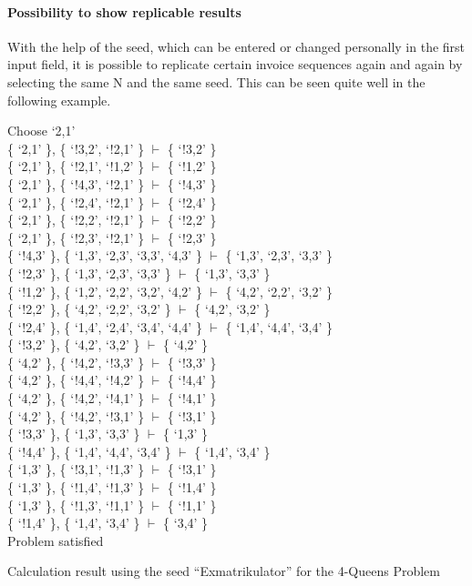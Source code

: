 \paragraph{Possibility to show replicable results}
With the help of the seed, which can be entered or changed personally in the first input field, it is possible to replicate certain invoice sequences again and again by selecting the same N and the same seed. This can be seen quite well in the following example.

\begin{listing}
Choose `2,1'\\
\{ `2,1' \}, \{ `!3,2', `!2,1' \} $\vdash$ \{ `!3,2' \}\\
\{ `2,1' \}, \{ `!2,1', `!1,2' \} $\vdash$ \{ `!1,2' \}\\
\{ `2,1' \}, \{ `!4,3', `!2,1' \} $\vdash$ \{ `!4,3' \}\\
\{ `2,1' \}, \{ `!2,4', `!2,1' \} $\vdash$ \{ `!2,4' \}\\
\{ `2,1' \}, \{ `!2,2', `!2,1' \} $\vdash$ \{ `!2,2' \}\\
\{ `2,1' \}, \{ `!2,3', `!2,1' \} $\vdash$ \{ `!2,3' \}\\
\{ `!4,3' \}, \{ `1,3', `2,3', `3,3', `4,3' \} $\vdash$ \{ `1,3', `2,3', `3,3' \}\\
\{ `!2,3' \}, \{ `1,3', `2,3', `3,3' \} $\vdash$ \{ `1,3', `3,3' \}\\
\{ `!1,2' \}, \{ `1,2', `2,2', `3,2', `4,2' \} $\vdash$ \{ `4,2', `2,2', `3,2' \}\\
\{ `!2,2' \}, \{ `4,2', `2,2', `3,2' \} $\vdash$ \{ `4,2', `3,2' \}\\
\{ `!2,4' \}, \{ `1,4', `2,4', `3,4', `4,4' \} $\vdash$ \{ `1,4', `4,4', `3,4' \}\\
\{ `!3,2' \}, \{ `4,2', `3,2' \} $\vdash$ \{ `4,2' \}\\
\{ `4,2' \}, \{ `!4,2', `!3,3' \} $\vdash$ \{ `!3,3' \}\\
\{ `4,2' \}, \{ `!4,4', `!4,2' \} $\vdash$ \{ `!4,4' \}\\
\{ `4,2' \}, \{ `!4,2', `!4,1' \} $\vdash$ \{ `!4,1' \}\\
\{ `4,2' \}, \{ `!4,2', `!3,1' \} $\vdash$ \{ `!3,1' \}\\
\{ `!3,3' \}, \{ `1,3', `3,3' \} $\vdash$ \{ `1,3' \}\\
\{ `!4,4' \}, \{ `1,4', `4,4', `3,4' \} $\vdash$ \{ `1,4', `3,4' \}\\
\{ `1,3' \}, \{ `!3,1', `!1,3' \} $\vdash$ \{ `!3,1' \}\\
\{ `1,3' \}, \{ `!1,4', `!1,3' \} $\vdash$ \{ `!1,4' \}\\
\{ `1,3' \}, \{ `!1,3', `!1,1' \} $\vdash$ \{ `!1,1' \}\\
\{ `!1,4' \}, \{ `1,4', `3,4' \} $\vdash$ \{ `3,4' \}\\
Problem satisfied
    \caption{Calculation result using the seed ``Exmatrikulator'' for the 4-Queens Problem}
    \label{code:calcExN4}
\end{listing}
